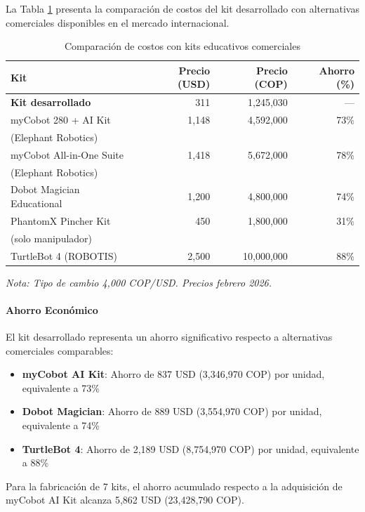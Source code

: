 La Tabla \ref{tab:comparacion_comercial} presenta la comparación de costos del kit desarrollado con alternativas comerciales disponibles en el mercado internacional.

\begin{table}[H]
\centering
\caption{Comparación de costos con kits educativos comerciales}
\label{tab:comparacion_comercial}
\small
\begin{tabular}{|l|r|r|r|}
\hline
\textbf{Kit} & \textbf{Precio (USD)} & \textbf{Precio (COP)} & \textbf{Ahorro (\%)} \\
\hline
\textbf{Kit desarrollado} & 311 & 1,245,030 & --- \\
\hline
myCobot 280 + AI Kit & 1,148 & 4,592,000 & 73\% \\
(Elephant Robotics) & & & \\
\hline
myCobot All-in-One Suite & 1,418 & 5,672,000 & 78\% \\
(Elephant Robotics) & & & \\
\hline
Dobot Magician Educational & 1,200 & 4,800,000 & 74\% \\
\hline
PhantomX Pincher Kit & 450 & 1,800,000 & 31\% \\
(solo manipulador) & & & \\
\hline
TurtleBot 4 (ROBOTIS) & 2,500 & 10,000,000 & 88\% \\
\hline
\end{tabular}
\end{table}

\textit{Nota: Tipo de cambio 4,000 COP/USD. Precios febrero 2026.}

\paragraph{Ahorro Económico}

El kit desarrollado representa un ahorro significativo respecto a alternativas comerciales comparables:

\begin{itemize}
    \item \textbf{myCobot AI Kit}: Ahorro de 837 USD (3,346,970 COP) por unidad, equivalente a 73\%
    \item \textbf{Dobot Magician}: Ahorro de 889 USD (3,554,970 COP) por unidad, equivalente a 74\%
    \item \textbf{TurtleBot 4}: Ahorro de 2,189 USD (8,754,970 COP) por unidad, equivalente a 88\%
\end{itemize}

Para la fabricación de 7 kits, el ahorro acumulado respecto a la adquisición de myCobot AI Kit alcanza 5,862 USD (23,428,790 COP).


